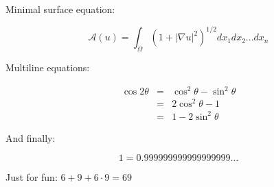 \documentclass{article}
\begin{document}
Minimal surface equation:

$$\mathcal{A}(u)=\int_\Omega(1+|\nabla u|^2)^{1/2} dx_1 dx_2 ... dx_n$$ 

Multiline equations:

\begin{eqnarray*}
\cos{2\theta} & = & \cos^2\theta - \sin^2\theta \\
              & = & 2\cos^2\theta - 1 \\
              & = & 1 - 2\sin^2\theta
\end{eqnarray*}

And finally:

$$1=0.999999999999999999\ldots$$

Just for fun: $6 + 9 + 6 \cdot 9 = 69$
\end{document}
